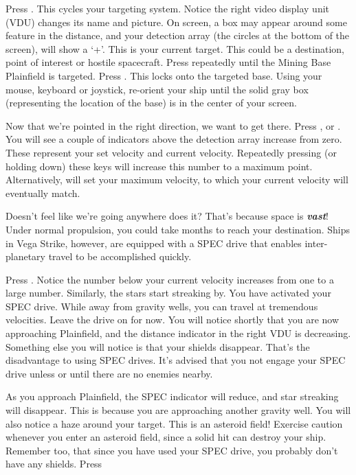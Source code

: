 \documentclass{article}
\newcommand{\key}[1]{%
  \tikz[baseline=(key.base)]{
    \node[draw=gray!50, fill=gray!5, rounded corners=2pt, inner sep=2pt, minimum height=1.5ex] (key) {\footnotesize\sffamily\bfseries #1};
  }%
}
\begin{document}
Press \key{t}. This cycles your targeting system. Notice the right video display unit (VDU) changes its name and picture. On screen, a box may appear around some feature in the distance, and your detection array (the circles at the bottom of the screen), will show a `+'. This is your current target. This could be a destination, point of interest or hostile spacecraft. Press \key{t} repeatedly until the Mining Base Plainfield is targeted. Press \key{l}. This locks onto the targeted base. Using your mouse, keyboard or joystick, re-orient your ship until the solid gray box (representing the location of the base) is in the center of your screen. 

Now that we're pointed in the right direction, we want to get there. Press \key{=}, \key{+} or \key{KP+}. You will see a couple of indicators above the detection array increase from zero. These represent your set velocity and current velocity. Repeatedly pressing (or holding down) these keys will increase this number to a maximum point. Alternatively, \key{\textbackslash} will set your maximum velocity, to which your current velocity will eventually match. 

Doesn't feel like we're going anywhere does it? That's because space is \textbf{\textit{vast}}! Under normal propulsion, you could take months to reach your destination. Ships in Vega Strike, however, are equipped with a SPEC drive that enables inter-planetary travel to be accomplished quickly. 

Press \key{a}. Notice the number below your current velocity increases from one to a large number.  Similarly, the stars start streaking by. You have activated your SPEC drive. While away from gravity wells, you can travel at tremendous velocities. Leave the drive on for now. You will notice shortly that you are now approaching Plainfield, and the distance indicator in the right VDU is decreasing. Something else you will notice is that your shields disappear. That's the disadvantage to using SPEC drives. It's advised that you not engage your SPEC drive unless or until there are no enemies nearby. 

As you approach Plainfield, the SPEC indicator will reduce, and star streaking will disappear. This is because you are approaching another gravity well. You will also notice a haze around your target. This is an asteroid field! Exercise caution whenever you enter an asteroid field, since a solid hit can destroy your ship. Remember too, that since you have used your SPEC drive, you probably don't have any shields. Press 
\end{document}
